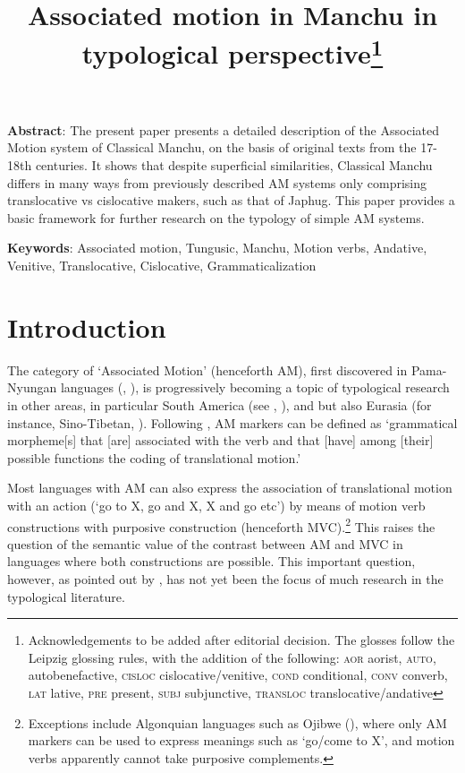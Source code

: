 \documentclass{article}
\begin{document}
 
\title{Associated motion in Manchu in typological perspective\footnote{Acknowledgements to be added after editorial decision. The glosses follow the Leipzig glossing rules, with the addition of the following: \textsc{aor} aorist, \textsc{auto}, autobenefactive, \textsc{cisloc} cislocative/venitive, \textsc{cond} conditional, \textsc{conv} converb, \textsc{lat} lative,  \textsc{pre} present, \textsc{subj} subjunctive, \textsc{transloc} translocative/andative } }
\maketitle 
\textbf{Abstract}: The present paper presents a detailed description of the Associated Motion system of Classical Manchu, on the basis of original texts from the 17-18th centuries. It shows that despite superficial similarities, Classical Manchu differs in many ways from previously described AM systems only comprising translocative vs cislocative makers, such as that of Japhug. This paper provides a basic framework for further research on the typology of simple AM systems.

\textbf{Keywords}: Associated motion, Tungusic, Manchu, Motion verbs, Andative, Venitive, Translocative, Cislocative, Grammaticalization

\section*{Introduction}
The category of `Associated Motion' (henceforth AM), first discovered in Pama-Nyungan languages (\citealt{koch84associated.motion}, \citealt{wilkins91associated.motion}), is progressively becoming a topic of typological research in other areas, in particular South America (see \citealt{guillaume08cavinena}, \citealt{guillaume16am}), and but also Eurasia (for instance, Sino-Tibetan, \citealt{jacques13harmonization}). Following \citet[12]{guillaume16am}, AM markers can be defined as `grammatical morpheme[s] that [are] associated with the verb
and that [have] among [their] possible functions the coding of translational
motion.'

Most languages with AM can also express the association of translational motion with an action (`go to X, go and X, X and go etc')  by means of motion verb constructions with purposive construction (henceforth MVC).\footnote{Exceptions include Algonquian languages such as Ojibwe (\citealt[729-733]{valentine01grammar}), where only AM markers can be used to express meanings such as `go/come to X', and motion verbs apparently cannot take purposive complements.} This raises the question of the semantic value of the contrast between AM and MVC in languages where both constructions are possible. This important question, however, as pointed out by \citet[10]{guillaume16am}, has not yet been the focus of much research in the typological literature.
\end{document}

